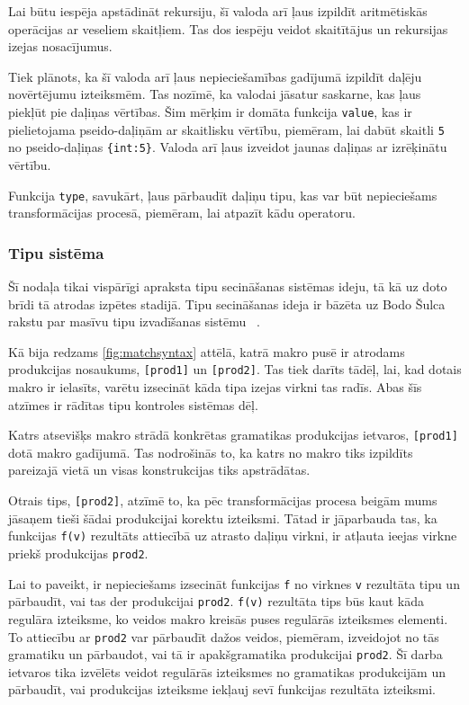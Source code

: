 Lai būtu iespēja apstādināt rekursiju, šī valoda arī ļaus izpildīt aritmētiskās operācijas ar veseliem skaitļiem. Tas dos iespēju veidot skaitītājus un rekursijas izejas nosacījumus.

Tiek plānots, ka šī valoda arī ļaus nepieciešamības gadījumā izpildīt daļēju novērtējumu izteiksmēm. Tas nozīmē, ka valodai jāsatur saskarne, kas ļaus piekļūt pie daļiņas vērtības. Šim mērķim ir domāta funkcija \verb|value|, kas ir pielietojama pseido-daļiņām ar skaitlisku vērtību, piemēram, lai dabūt skaitli \verb|5| no pseido-daļiņas \verb|{int:5}|. Valoda arī ļaus izveidot jaunas daļiņas ar izrēķinātu vērtību.

Funkcija \verb|type|, savukārt, ļaus pārbaudīt daļiņu tipu, kas var būt nepieciešams transformācijas procesā, piemēram, lai atpazīt kādu operatoru.

\subsubsection{\label{sbsbs:sys_typesystem}Tipu sistēma}

Šī nodaļa tikai vispārīgi apraksta tipu secināšanas sistēmas ideju, tā kā uz doto brīdi tā atrodas izpētes stadijā. Tipu secināšanas ideja ir bāzēta uz Bodo Šulca rakstu par masīvu tipu izvadīšanas sistēmu ~\cite{Scholz:SACTypeSystem}.

Kā bija redzams \ref{fig:matchsyntax} attēlā, katrā makro pusē ir atrodams produkcijas nosaukums, \verb|[prod1]| un \verb|[prod2]|. Tas tiek darīts tādēļ, lai, kad dotais makro ir ielasīts, varētu izsecināt kāda tipa izejas virkni tas radīs. Abas šīs atzīmes ir rādītas tipu kontroles sistēmas dēļ.

Katrs atsevišķs makro strādā konkrētas gramatikas produkcijas ietvaros, \verb|[prod1]| dotā makro gadījumā. Tas nodrošinās to, ka katrs no makro tiks izpildīts pareizajā vietā un visas konstrukcijas tiks apstrādātas. 

Otrais tips, \verb|[prod2]|, atzīmē to, ka pēc transformācijas procesa beigām mums jāsaņem tieši šādai produkcijai korektu izteiksmi. Tātad ir jāparbauda tas, ka funkcijas \verb|f(v)| rezultāts attiecībā uz atrasto daļiņu virkni, ir atļauta ieejas virkne priekš produkcijas \verb|prod2|.

Lai to paveikt, ir nepieciešams izsecināt funkcijas \verb|f| no virknes \verb|v| rezultāta tipu un pārbaudīt, vai tas der produkcijai \verb|prod2|. \verb|f(v)| rezultāta tips būs kaut kāda regulāra izteiksme, ko veidos makro kreisās puses regulārās izteiksmes elementi. To attiecību ar \verb|prod2| var pārbaudīt dažos veidos, piemēram, izveidojot no tās gramatiku un pārbaudot, vai tā ir apakšgramatika produkcijai \verb|prod2|. Šī darba ietvaros tika izvēlēts veidot regulārās izteiksmes no gramatikas produkcijām un pārbaudīt, vai produkcijas izteiksme iekļauj sevī funkcijas rezultāta izteiksmi.

